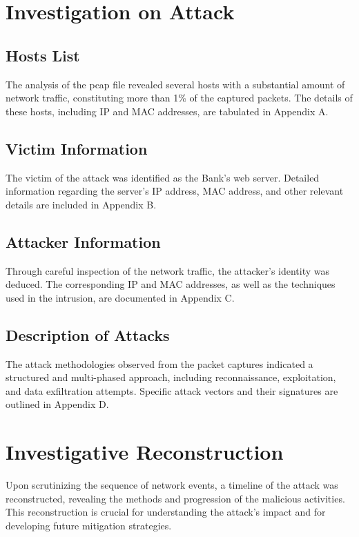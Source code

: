 \documentclass{article}
\begin{document}
    \section{\fontsize{14pt}{17pt}\selectfont Investigation on Attack}\label{sec:selectfont-investigation-on-attack}
    \subsection{Hosts List}\label{subsec:hosts-list}
    The analysis of the pcap file revealed several hosts with a substantial amount of network traffic,
    constituting more than 1\% of the captured packets.
    The details of these hosts, including IP and MAC addresses, are tabulated in Appendix A.

    \subsection{Victim Information}\label{subsec:victim-information}
    The victim of the attack was identified as the Bank's web server.
    Detailed information regarding the server's IP address, MAC address, and other relevant details are included in Appendix B.

    \subsection{Attacker Information}\label{subsec:attacker-information}
    Through careful inspection of the network traffic, the attacker's identity was deduced.
    The corresponding IP and MAC addresses, as well as the techniques used in the intrusion, are documented in Appendix C.

    \subsection{Description of Attacks}\label{subsec:description-of-attacks}
    The attack methodologies observed from the packet captures indicated a structured and multi-phased approach,
    including reconnaissance, exploitation, and data exfiltration attempts.
    Specific attack vectors and their signatures are outlined in Appendix D.


    \section{\fontsize{14pt}{17pt}\selectfont Investigative Reconstruction}\label{sec:selectfont-investigative-reconstruction}
    Upon scrutinizing the sequence of network events, a timeline of the attack was reconstructed,
    revealing the methods and progression of the malicious activities.
    This reconstruction is crucial for understanding the attack's impact and for developing future mitigation strategies.
\end{document}
